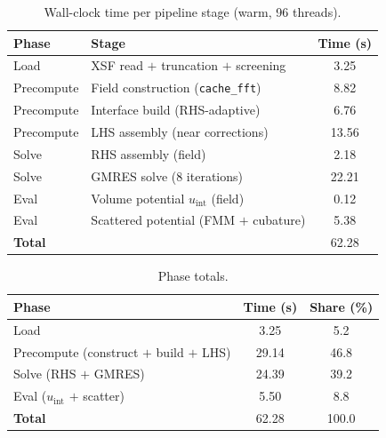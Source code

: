 \documentclass[11pt]{article}
\begin{document}
\begin{table}[h]
\centering
\begin{tabular}{l l S[table-format=2.2]}
\toprule
\textbf{Phase} & \textbf{Stage} & {\textbf{Time (s)}}\\
\midrule
Load        & XSF read $+$ truncation $+$ screening      & 3.25\\
\addlinespace
Precompute  & Field construction (\texttt{cache\_fft})    & 8.82\\
Precompute  & Interface build (RHS-adaptive)              & 6.76\\
Precompute  & LHS assembly (near corrections)             & 13.56\\
\addlinespace
Solve       & RHS assembly (field)                        & 2.18\\
Solve       & GMRES solve (8 iterations)                  & 22.21\\
\addlinespace
Eval        & Volume potential $u_{\mathrm{int}}$ (field) & 0.12\\
Eval        & Scattered potential (FMM $+$ cubature)      & 5.38\\
\midrule
\textbf{Total} & & 62.28\\
\bottomrule
\end{tabular}
\caption{Wall-clock time per pipeline stage (warm, 96 threads).}
\end{table}

\begin{table}[h]
\centering
\begin{tabular}{l S[table-format=2.2] S[table-format=2.1]}
\toprule
\textbf{Phase} & {\textbf{Time (s)}} & {\textbf{Share (\%)}}\\
\midrule
Load                                & 3.25  & 5.2\\
Precompute (construct $+$ build $+$ LHS) & 29.14 & 46.8\\
Solve (RHS $+$ GMRES)               & 24.39 & 39.2\\
Eval ($u_{\mathrm{int}}$ $+$ scatter) & 5.50  & 8.8\\
\midrule
\textbf{Total}                      & 62.28 & 100.0\\
\bottomrule
\end{tabular}
\caption{Phase totals.}
\end{table}
\end{document}
